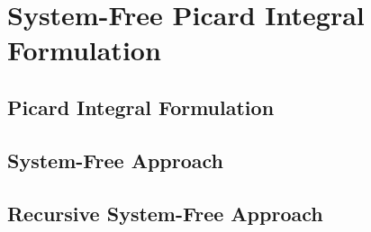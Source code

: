 \chapter{System-Free Picard Integral Formulation}\label{chap:sfpif}




\section{Picard Integral Formulation}\label{sec:pif}

\section{System-Free Approach}\label{sec:original_sf}

\section{Recursive System-Free Approach}\label{sec:recursive_sf}
